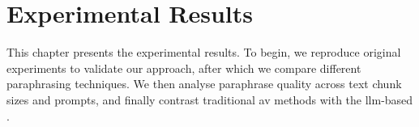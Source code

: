 \chapter{Experimental Results}
\label{chap:experimental_results}

This chapter presents the experimental results. 
To begin, we reproduce original experiments to validate our approach, after which we compare different paraphrasing techniques. 
We then analyse paraphrase quality across text chunk sizes and prompts, and finally contrast traditional \ac{av} methods with the \ac{llm}-based \impAppr{}.









% 

% 

% 

